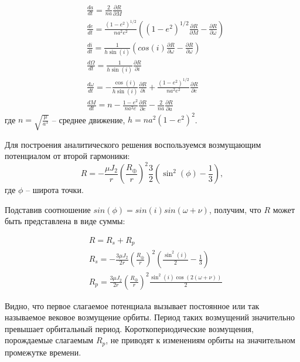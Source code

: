 \begin{align*}
    & \frac{da}{dt} = \frac{2}{na} \frac{\partial R}{\partial M} \\
    & \frac{de}{dt} = \frac{(1 - e^2)^{1 / 2}}{n a^2 e^2}
                    \left((1 - e^2)^{1 / 2} \frac{\partial R}{\partial M} 
                    - \frac{\partial R}{\partial \omega} \right) \\
    & \frac{di}{dt} = \frac{1}{h \sin(i)} \left(cos(i) \frac{\partial R}{\partial \omega} 
                                                        - \frac{\partial R}{\partial \omega} \right) \\
    & \frac{d \Omega}{dt} = \frac{1}{h \sin(i)} \frac{\partial R}{\partial i} \\
    & \frac{d \omega}{dt} = - \frac{\cos(i)}{h \sin(i)} \frac{\partial R}{\partial i}
                            + \frac{(1 - e^2)^{1 / 2}}{n a^2 e^2} \frac{\partial R}{\partial e} \\
    & \frac{dM}{dt} = n - \frac{1 - e^2}{n a^2 e} \frac{\partial R}{\partial e} 
                        - \frac{2}{na} \frac{\partial R}{\partial a}
\end{align*}
где $n = \sqrt{\frac{\mu}{a^3}}$ -- среднее движение, $h = n a^2 (1 - e^2)^2$.

Для построения аналитического решения воспользуемся возмущающим потенциалом от второй гармоники:
 \begin{equation}
    R = - \frac{\mu J_2}{r} \left( \frac{R_\oplus}{r} \right)^2 
        \frac{3}{2} \left(\sin^2(\phi) - \frac{1}{3}\right),
 \end{equation}
где $\phi$ -- широта точки.

Подставив соотношение $sin(\phi) = sin(i) sin(\omega + \nu)$, получим, что $R$ может быть представлена в виде суммы:

\begin{align*}
    & R = R_s + R_p \\
    & R_s = - \frac{3 \mu J_2}{2 r} \left( \frac{R_\oplus}{r} \right)^2 
            \left( \frac{\sin^2(i)}{2} - \frac{1}{3} \right) \\
    & R_p = \frac{3 \mu J_2}{2 r} \left( \frac{R_\oplus}{r} \right)^2
            \frac{\sin^2(i) \cos(2(\omega + \nu))}{2}
\end{align*}

Видно, что первое слагаемое потенциала вызывает постоянное или так называемое вековое возмущение орбиты. 
Период таких возмущений значительно превышает орбитальный период. 
Короткопериодические возмущения, порождаемые слагаемым $R_p$, не приводят к изменениям орбиты на значительном промежутке времени.

